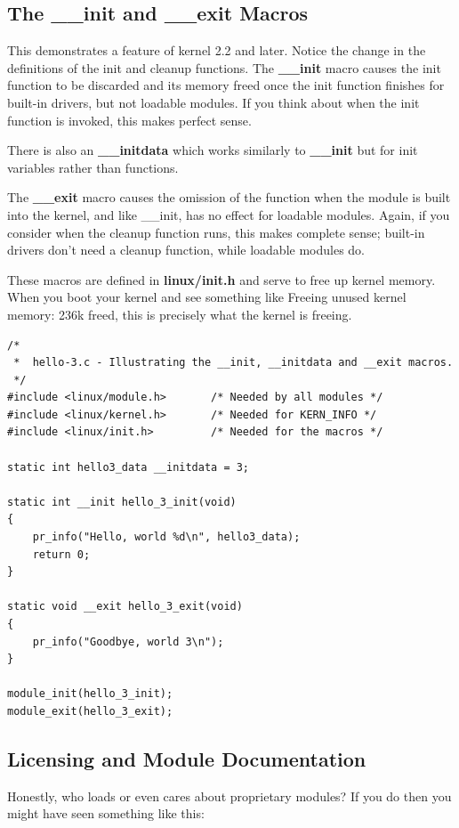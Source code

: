 \documentclass[11pt]{article}
\begin{document}
\subsection*{The \_\_init and \_\_exit Macros}
\label{sec:orgbf7bc3b}
This demonstrates a feature of kernel 2.2 and later. Notice the change in the definitions of the init and cleanup functions. The \textbf{\_\_init} macro causes the init function to be discarded and its memory freed once the init function finishes for built-in drivers, but not loadable modules. If you think about when the init function is invoked, this makes perfect sense.

There is also an \textbf{\_\_initdata} which works similarly to \textbf{\_\_init} but for init variables rather than functions.

The \textbf{\_\_exit} macro causes the omission of the function when the module is built into the kernel, and like \_\_init, has no effect for loadable modules. Again, if you consider when the cleanup function runs, this makes complete sense; built-in drivers don't need a cleanup function, while loadable modules do.

These macros are defined in \textbf{linux/init.h} and serve to free up kernel memory. When you boot your kernel and see something like Freeing unused kernel memory: 236k freed, this is precisely what the kernel is freeing.

\begin{verbatim}
/*
 *  hello-3.c - Illustrating the __init, __initdata and __exit macros.
 */
#include <linux/module.h>       /* Needed by all modules */
#include <linux/kernel.h>       /* Needed for KERN_INFO */
#include <linux/init.h>         /* Needed for the macros */

static int hello3_data __initdata = 3;

static int __init hello_3_init(void)
{
    pr_info("Hello, world %d\n", hello3_data);
    return 0;
}

static void __exit hello_3_exit(void)
{
    pr_info("Goodbye, world 3\n");
}

module_init(hello_3_init);
module_exit(hello_3_exit);
\end{verbatim}

\subsection*{Licensing and Module Documentation}
\label{sec:org37febfd}
Honestly, who loads or even cares about proprietary modules? If you do then you might have seen something like this:
\end{document}
